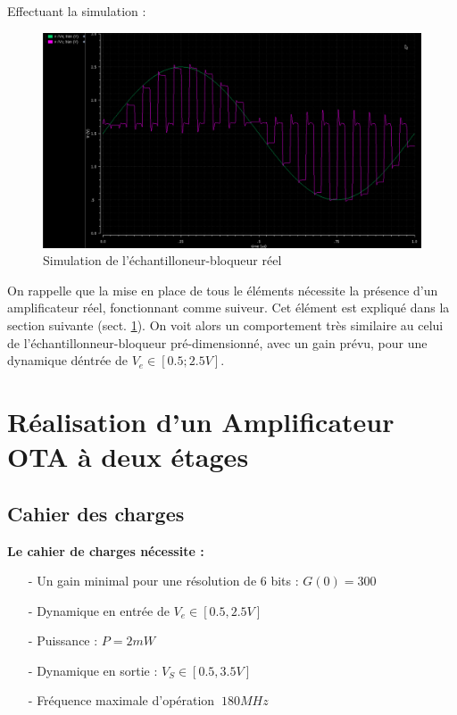\documentclass[11pt]{article}
\begin{document}
Effectuant la simulation :

\begin{figure}[!htb]
\begin{center}
  \includegraphics[width=0.80\linewidth]{simu_ech_bloqueur_reel.png}
  \caption{Simulation de l'\'echantilloneur-bloqueur r\'eel}
\end{center}
\end{figure}

On rappelle que la mise en place de tous le \'el\'ements n\'ecessite la pr\'esence d'un amplificateur
r\'eel, fonctionnant comme suiveur. Cet \'el\'ement est expliqu\'e dans la section suivante (sect. \ref{OTA_sect}). On voit alors un comportement tr\`es similaire au celui de l'\'echantillonneur-bloqueur pr\'e-dimensionn\'e, avec un gain pr\'evu, pour une dynamique d\'entr\'ee de $V_e \in [0.5; 2.5 V] $.

\clearpage
\section{R\'ealisation d'un Amplificateur OTA \`a deux \'etages}\label{OTA_sect}

\subsection{Cahier des charges}

\textbf{Le cahier de charges n\'ecessite :}
\begin{itemize} \itemsep -4pt
  \item[-] Un gain minimal pour une r\'esolution de 6 bits : $G(0) = 300$
  \item[-] Dynamique en entr\'ee de $V_e \in [0.5, 2.5 V]$
  \item[-] Puissance : $P = 2mW$
  \item[-] Dynamique en sortie : $V_S \in [0.5, 3.5 V]$
    \item[-] Fr\'equence maximale d'op\'eration $~ 180 MHz$
\end{itemize}
\end{document}
